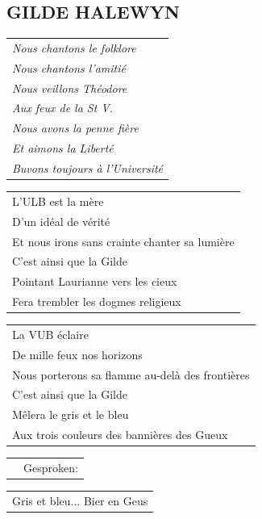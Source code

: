 \documentclass{article}
\begin{document}
\subsection*{GILDE HALEWYN}
\begin{flushleft}
\begin{tabularx}{\textwidth} {
    >{\raggedright\arraybackslash}X}
\textit{Nous chantons le folklore}\\
\textit{Nous chantons l’amitié}\\
\textit{Nous veillons Théodore}\\
\textit{Aux feux de la St V.}\\
\textit{Nous avons la penne fière}\\
\textit{Et aimons la Liberté}\\
\textit{Buvons toujours à l’Université}\\
\end{tabularx}
\end{flushleft}
\begin{flushleft}
\begin{tabularx}{\textwidth} {
    >{\raggedright\arraybackslash}X}
L’ULB est la mère\\
D’un idéal de vérité\\
Et nous irons sans crainte chanter sa lumière\\
C’est ainsi que la Gilde\\
Pointant Laurianne vers les cieux\\
Fera trembler les dogmes religieux\\
\end{tabularx}
\end{flushleft}
\begin{flushleft}
\begin{tabularx}{\textwidth} {
    >{\raggedright\arraybackslash}X}
La VUB éclaire\\
De mille feux nos horizons\\
Nous porterons sa flamme au-delà des frontières\\
C’est ainsi que la Gilde\\
Mêlera le gris et le bleu\\
Aux trois couleurs des bannières des Gueux\\
\end{tabularx}
\end{flushleft}
\begin{flushleft}
\begin{tabularx}{\textwidth} {
    c >{\raggedright\arraybackslash}X}
\hspace{5mm} & {\small Gesproken:}\\
\end{tabularx}
\end{flushleft}
\begin{flushleft}
\begin{tabularx}{\textwidth} {
    >{\raggedright\arraybackslash}X}
Gris et bleu... Bier en Geus\\
\end{tabularx}
\end{flushleft}
\end{document}
